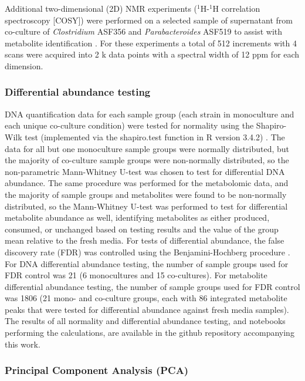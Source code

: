 \documentclass[11pt,twocolumn,notitlepage,openany,twoside]{book}
\begin{document}
\begin{refsection}
Additional two-dimensional (2D) NMR experiments ($^1\!$H-$^1\!$H correlation spectroscopy [COSY]) were performed on a selected sample of supernatant from co-culture of \textit{Clostridium} ASF356 and \textit{Parabacteroides} ASF519 to assist with metabolite identification \cite{Beckonert2007-cj}. For these experiments a total of 512 increments with 4 scans were acquired into 2 k data points with a spectral width of 12 ppm for each dimension.

\subsubsection{Differential abundance testing}

DNA quantification data for each sample group (each strain in monoculture and each unique co-culture condition) were tested for normality using the Shapiro-Wilk test (implemented via the shapiro.test function in R version 3.4.2) \cite{Royston1982-mm}. The data for all but one monoculture sample groups were normally distributed, but the majority of co-culture sample groups were non-normally distributed, so the non-parametric Mann-Whitney U-test was chosen to test for differential DNA abundance. The same procedure was performed for the metabolomic data, and the majority of sample groups and metabolites were found to be non-normally distributed, so the Mann-Whitney U-test was performed to test for differential metabolite abundance as well, identifying metabolites as either produced, consumed, or unchanged based on testing results and the value of the group mean relative to the fresh media. For tests of differential abundance, the false discovery rate (FDR) was controlled using the Benjamini-Hochberg procedure \cite{Benjamini1995-nd}. For DNA differential abundance testing, the number of sample groups used for FDR control was 21 (6 monocultures and 15 co-cultures). For metabolite differential abundance testing, the number of sample groups used for FDR control was 1806 (21 mono- and co-culture groups, each with 86 integrated metabolite peaks that were tested for differential abundance against fresh media samples). The results of all normality and differential abundance testing, and notebooks performing the calculations, are available in the github repository accompanying this work.

\subsubsection{Principal Component Analysis (PCA)}


\end{refsection}
\end{document}
